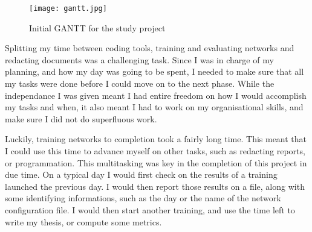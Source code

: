 \begin{figure}
  \centering
	\texttt{[image: gantt.jpg]}
	\caption[]{Initial GANTT for the study project}
  \label{fig:gantt}
\end{figure}

Splitting my time between coding tools, training and evaluating networks and redacting documents was a challenging task. Since I was in charge of my planning, and how my day was going to be spent, I needed to make sure that all my tasks were done before I could move on to the next phase. While the independance I was given meant I had entire freedom on how I would accomplish my tasks and when, it also meant I had to work on my organisational skills, and make sure I did not do superfluous work. 

Luckily, training networks to completion took a fairly long time. This meant that I could use this time to advance myself on other tasks, such as redacting reports, or programmation. This multitasking was key in the completion of this project in due time. On a typical day I would first check on the results of a training launched the previous day. I would then report those results on a file, along with some identifying informations, such as the day or the name of the network configuration file. I would then start another training, and use the time left to write my thesis, or compute some metrics. 
